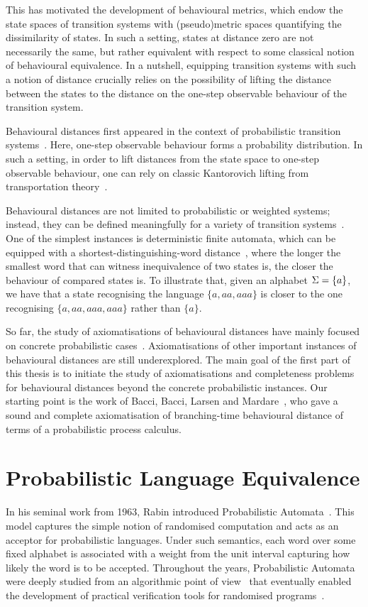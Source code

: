 This has motivated the development of behavioural metrics, which endow the state spaces of transition systems with (pseudo)metric spaces quantifying the dissimilarity of states. In such a setting, states at distance zero are not necessarily the same, but rather equivalent with respect to some classical notion of behavioural equivalence. In a nutshell, equipping transition systems with such a notion of distance crucially relies on the possibility of lifting the distance between the states to the distance on the one-step observable behaviour of the transition system.

Behavioural distances first appeared in the context of probabilistic transition systems~\cite{Desharnais:2004:Metrics,Breugel:2001:Towards}. Here, one-step observable behaviour forms a probability distribution. In such a setting, in order to lift distances from the state space to one-step observable behaviour, one can rely on classic Kantorovich lifting from transportation theory~\cite{Villani:2009:Optimal}. 

Behavioural distances are not limited to probabilistic or weighted systems; instead, they can be defined meaningfully for a variety of transition systems~\cite{Baldan:2018:Coalgebraic}. One of the simplest instances is deterministic finite automata, which can be equipped with a shortest-distinguishing-word distance~\cite{Bonchi:2018:UpTo}, where the longer the smallest word that can witness inequivalence of two states is, the closer the behaviour of compared states is. To illustrate that, given an alphabet $\Sigma = \{a\}$, we have that a state recognising the language $\{a,aa, aaa\}$ is closer to the one recognising $\{a,aa,aaa,aaa\}$ rather than $\{a\}$. 

So far, the study of axiomatisations of behavioural distances have mainly focused on concrete probabilistic cases~\cite{Bacci:2018:Bisimilarity,Bacci:2018:TV,Bacci:2018:Algebraic}. Axiomatisations of other important instances of behavioural distances are still underexplored. The main goal of the first part of this thesis is to initiate the study of axiomatisations and completeness problems for behavioural distances beyond the concrete probabilistic instances. Our starting point is the work of Bacci, Bacci, Larsen and Mardare~\cite{Bacci:2018:Bisimilarity}, who gave a sound and complete axiomatisation of branching-time behavioural distance of terms of a probabilistic process calculus.

\section{Probabilistic Language Equivalence}
In his seminal work from 1963, Rabin introduced Probabilistic Automata~\cite{Rabin:1963:Probabilistic}. This model captures the simple notion of randomised computation and acts as an acceptor for probabilistic languages. Under such semantics, each word over some fixed alphabet is associated with a weight from the unit interval capturing how likely the word is to be accepted. Throughout the years, Probabilistic Automata were deeply studied from an algorithmic point of view~\cite{Kiefer:2011:Language} that eventually enabled the development of practical verification tools for randomised programs~\cite{Kiefer:2012:APEX}. 

